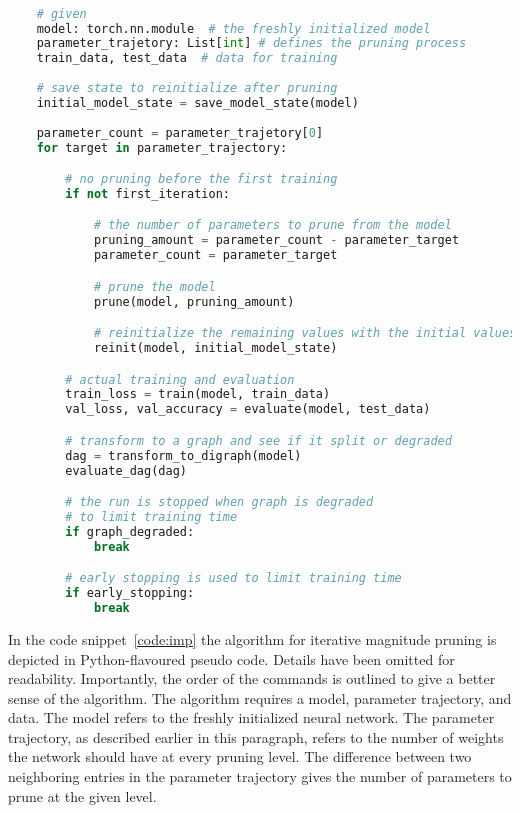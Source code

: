 \begin{minipage}{\linewidth}
\begin{lstlisting}[language=Python,caption={This code snippet contains Python-flavoured pseudo code.
    It depicts the general procedure of iterative magnitude pruning used for the experiments in this thesis.},captionpos=b, label={code:imp}]

    # given
    model: torch.nn.module  # the freshly initialized model 
    parameter_trajetory: List[int] # defines the pruning process
    train_data, test_data  # data for training
    
    # save state to reinitialize after pruning
    initial_model_state = save_model_state(model)
    
    parameter_count = parameter_trajetory[0]
    for target in parameter_trajectory:

        # no pruning before the first training
        if not first_iteration:

            # the number of parameters to prune from the model
            pruning_amount = parameter_count - parameter_target
            parameter_count = parameter_target

            # prune the model 
            prune(model, pruning_amount)

            # reinitialize the remaining values with the initial values
            reinit(model, initial_model_state)

        # actual training and evaluation
        train_loss = train(model, train_data)
        val_loss, val_accuracy = evaluate(model, test_data)

        # transform to a graph and see if it split or degraded
        dag = transform_to_digraph(model)
        evaluate_dag(dag)

        # the run is stopped when graph is degraded 
        # to limit training time
        if graph_degraded:
            break

        # early stopping is used to limit training time
        if early_stopping:
            break
    \end{lstlisting}
\end{minipage}

In the code snippet~\ref{code:imp} the algorithm for iterative magnitude pruning is depicted in Python-flavoured pseudo code.
Details have been omitted for readability.
Importantly, the order of the commands is outlined to give a better sense of the algorithm.
The algorithm requires a model, parameter trajectory, and data.
The model refers to the freshly initialized neural network.
The parameter trajectory, as described earlier in this paragraph, refers to the number of weights the network should have at every pruning level.
The difference between two neighboring entries in the parameter trajectory gives the number of parameters to prune at the given level.

